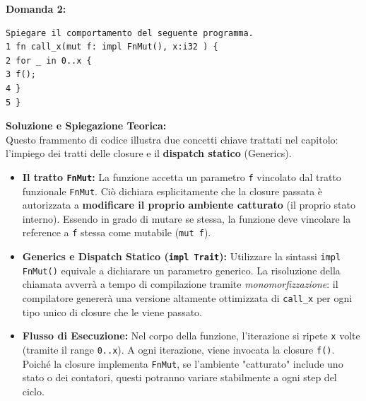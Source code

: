 \begin{exambox}
\textbf{Domanda 2:}
\begin{verbatim}
Spiegare il comportamento del seguente programma.
1 fn call_x(mut f: impl FnMut(), x:i32 ) {
2 for _ in 0..x {
3 f();
4 }
5 }
\end{verbatim}

\textbf{Soluzione e Spiegazione Teorica:} \\
Questo frammento di codice illustra due concetti chiave trattati nel capitolo: l'impiego dei tratti delle closure e il \textbf{dispatch statico} (Generics).

\begin{itemize}
    \item \textbf{Il tratto \texttt{FnMut}:} La funzione accetta un parametro \texttt{f} vincolato dal tratto funzionale \texttt{FnMut}. Ciò dichiara esplicitamente che la closure passata è autorizzata a \textbf{modificare il proprio ambiente catturato} (il proprio stato interno). Essendo in grado di mutare se stessa, la funzione deve vincolare la reference a \texttt{f} stessa come mutabile (\texttt{mut f}).
    \item \textbf{Generics e Dispatch Statico (\texttt{impl Trait}):} Utilizzare la sintassi \texttt{impl FnMut()} equivale a dichiarare un parametro generico. La risoluzione della chiamata avverrà a tempo di compilazione tramite \textit{monomorfizzazione}: il compilatore genererà una versione altamente ottimizzata di \texttt{call\_x} per ogni tipo unico di closure che le viene passato.
    \item \textbf{Flusso di Esecuzione:} Nel corpo della funzione, l'iterazione si ripete \texttt{x} volte (tramite il range \texttt{0..x}). A ogni iterazione, viene invocata la closure \texttt{f()}. Poiché la closure implementa \texttt{FnMut}, se l'ambiente "catturato" include uno stato o dei contatori, questi potranno variare stabilmente a ogni step del ciclo.
\end{itemize}
\end{exambox}
